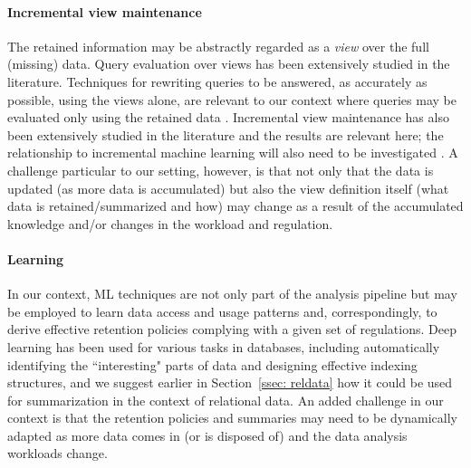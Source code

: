 \documentclass[11pt,dvipdfm]{article}
\begin{document}
\paragraph*{Incremental view maintenance}
The retained information may be
abstractly regarded as a {\em view} over the full (missing) data.
Query evaluation over views has been extensively studied in the
literature. Techniques for rewriting queries to be answered, as
accurately as possible, using the views alone, are relevant to our
context where queries may be evaluated only using the retained data
\cite{alon}. Incremental view maintenance has also been extensively
studied in the literature \cite{incrementalviews} and the results
are relevant here; the
relationship to incremental machine learning will also need to be
investigated \cite{WuTD20, WuDD20}.
A challenge particular to our setting, however,
is that not only that the data is updated (as more data is
accumulated) but also the view definition itself (what data is
retained/summarized and how) may change as a result of the accumulated
knowledge and/or changes in the workload and regulation. 

\paragraph*{Learning}
In our context, ML techniques are not only part of the analysis pipeline but may be employed to learn data access and usage patterns and, correspondingly, to derive effective retention
policies complying with a given set of regulations. 
Deep learning has been used for various tasks in databases, including automatically identifying the ``interesting"  parts of data \cite{sigmod20,edbt19} and designing effective indexing structures, and we suggest earlier in Section~\ref{ssec: reldata} how it could be used for summarization in the context of relational data. 
An added challenge in our context is that
the retention policies and summaries may need to be dynamically
adapted as more data comes in (or is disposed of) and the data
analysis workloads change.
\end{document}
